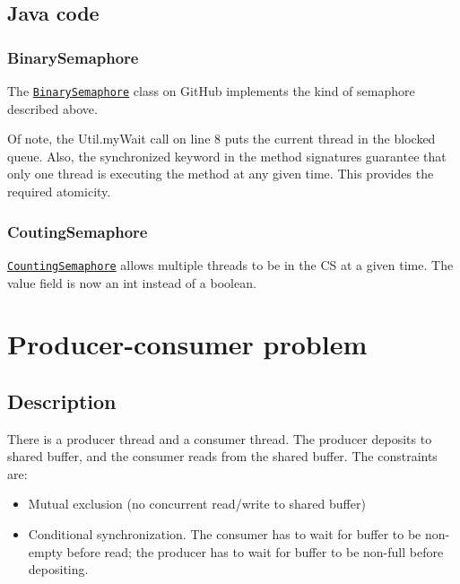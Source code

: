 \documentclass[twoside]{article}
\begin{document}
\subsection{Java code}
\subsubsection{BinarySemaphore}

The \href{https://github.com/vijaygarg1/UT-Garg-EE382C-EE361C-Multicore/blob/master/chapter3-synchronization_primitives/BinarySemaphore.java}{{\tt BinarySemaphore}} class on GitHub implements the kind of semaphore described above.

Of note, the Util.myWait call on line 8 puts the current thread in the blocked queue. Also, the synchronized keyword in the method signatures guarantee that only one thread is executing the method at any given time. This provides the required atomicity.

\subsubsection{CoutingSemaphore}

\href{https://github.com/vijaygarg1/UT-Garg-EE382C-EE361C-Multicore/blob/master/chapter3-synchronization_primitives/CountingSemaphore.java}{{\tt CountingSemaphore}} allows multiple threads to be in the CS at a given time. The value field is now an int instead of a boolean.

\section{Producer-consumer problem}

\subsection{Description}

There is a producer thread and a consumer thread. The producer deposits to shared buffer, and the consumer reads from the shared buffer. The constraints are:

\begin{itemize}
    \item Mutual exclusion (no concurrent read/write to shared buffer)
    \item Conditional synchronization. The consumer has to wait for buffer to be non-empty before read; the producer has to wait for buffer to be non-full before depositing.
\end{itemize}
\end{document}
